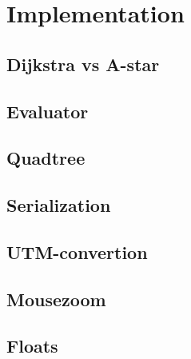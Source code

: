 \chapter{Implementation}
\section{Dijkstra vs A-star}

\section{Evaluator}

\section{Quadtree}

\section{Serialization}

\section{UTM-convertion}

\section{Mousezoom}

\section{Floats}